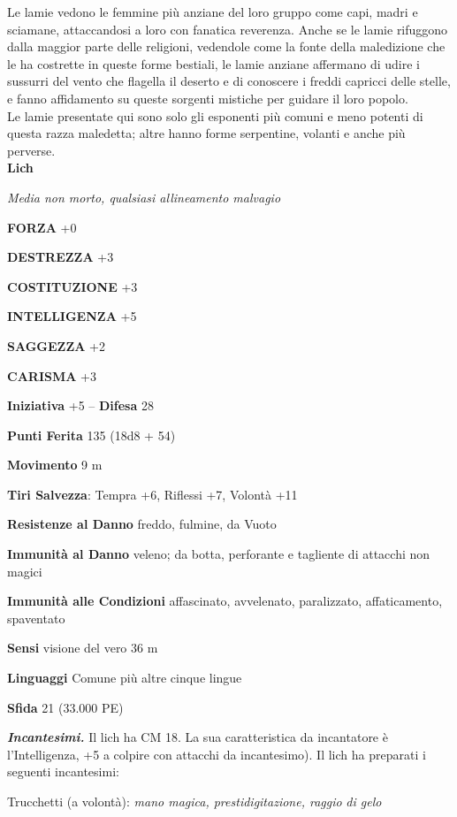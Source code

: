 \begin{multicols}{2}
Le lamie vedono le femmine più anziane del loro gruppo come capi, madri e sciamane, attaccandosi a loro con fanatica reverenza. Anche se le lamie rifuggono dalla maggior parte delle religioni, vedendole come la fonte della maledizione che le ha costrette in queste forme bestiali, le lamie anziane affermano di udire i sussurri del vento che flagella il deserto e di conoscere i freddi capricci delle stelle, e fanno affidamento su queste sorgenti mistiche per guidare il loro popolo.\\

Le lamie presentate qui sono solo gli esponenti più comuni e meno potenti di questa razza maledetta; altre hanno forme serpentine, volanti e anche più perverse.\\


\medskip{}\textbf{Lich}

\emph{Media non morto, qualsiasi allineamento malvagio}

\textbf{FORZA} +0

\textbf{DESTREZZA} +3

\textbf{COSTITUZIONE} +3

\textbf{INTELLIGENZA} +5

\textbf{SAGGEZZA} +2

\textbf{CARISMA} +3

\textbf{Iniziativa} +5 -- \textbf{Difesa} 28

\textbf{Punti Ferita} 135 (18d8 + 54)

\textbf{Movimento} 9 m

\textbf{Tiri Salvezza}: Tempra +6, Riflessi +7, Volontà +11

\textbf{Resistenze al Danno} freddo, fulmine, da Vuoto

\textbf{Immunità al Danno} veleno; da botta, perforante e tagliente di attacchi non magici

\textbf{Immunità alle Condizioni} affascinato, avvelenato, paralizzato, affaticamento, spaventato

\textbf{Sensi} visione del vero 36 m

\textbf{Linguaggi} Comune più altre cinque lingue

\textbf{Sfida} 21 (33.000 PE)

\emph{\textbf{Incantesimi.}} Il lich ha CM 18. La sua caratteristica da incantatore è l'Intelligenza, +5 a colpire con attacchi da incantesimo). Il lich ha preparati i seguenti incantesimi:

Trucchetti (a volontà): \emph{mano magica, prestidigitazione, raggio} \emph{di gelo}


\end{multicols}
